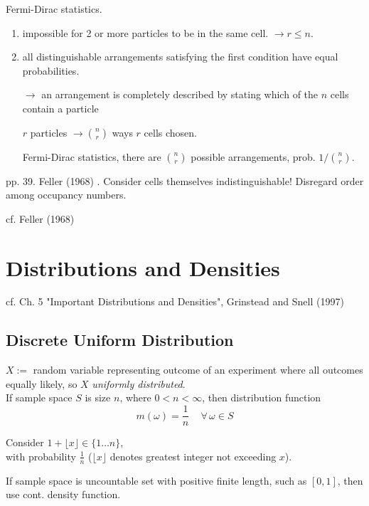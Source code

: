 \documentclass[10pt]{amsart}
\begin{document}
\begin{multicols*}{2}
\begin{enumerate}
Fermi-Dirac statistics.  
\begin{enumerate}
\item[(1)] impossible for 2 or more particles to be in the same cell.  $\to r \leq n$.  
\item[(2)] all distinguishable arrangements satisfying the first condition have equal probabilities.  

$\to$ an arrangement is completely described by stating which of the $n$ cells contain a particle  

$r$ particles $\to \binom{n}{r}$ ways $r$ cells chosen.  

Fermi-Dirac statistics, there are $\binom{n}{r}$ possible arrangements, prob. $1/\binom{n}{r}$.  
\end{enumerate}
\end{enumerate}
pp. 39.  Feller (1968)  \cite{Fell1968}.  Consider cells themselves indistinguishable!  Disregard order among occupancy numbers.  








cf. Feller (1968)  \cite{Fell1968}

\section{Distributions and Densities}

cf. Ch. 5 "Important Distributions and Densities", Grinstead and Snell (1997) \cite{GrSn1997}

\subsection{Discrete Uniform Distribution}

$X:=$ random variable representing outcome of an experiment where all outcomes equally likely, so $X$ \emph{uniformly distributed}. \\

If sample space $S$ is size $n$, where $0 < n < \infty$, then distribution function
\[
m(\omega) = \frac{1}{n} \quad \, \forall \, \omega \in S
\]

Consider $1 + \lfloor x \rfloor \in \lbrace 1 \dots n \rbrace$, \\
with probability $\frac{1}{n}$ ($\lfloor x \rfloor$ denotes greatest integer not exceeding $x$).

If sample space is uncountable set with positive finite length, such as $[0, 1]$, then use cont. density function.


\end{multicols*}
\end{document}
